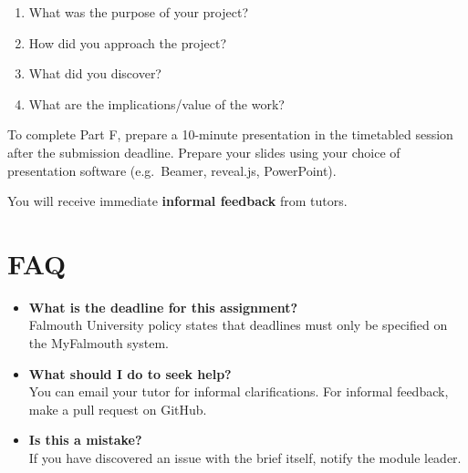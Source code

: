 \begin{enumerate}[label=(\roman*)]
	\item What was the purpose of your project?
	\item How did you approach the project?
	\item What did you discover?
	\item What are the implications/value of the work?
\end{enumerate}

To complete Part F, prepare a 10-minute presentation in the timetabled session after the submission deadline.
Prepare your slides using your choice of presentation software (e.g.\ Beamer, reveal.js, PowerPoint).

You will receive immediate \textbf{informal feedback} from tutors.

\section*{FAQ}

\begin{itemize}
	\item 	\textbf{What is the deadline for this assignment?} \\ 
    		Falmouth University policy states that deadlines must only be specified on the MyFalmouth system.
    		
	\item 	\textbf{What should I do to seek help?} \\ 
    		You can email your tutor for informal clarifications. For informal feedback, make a pull request on GitHub. 
    		
    	\item 	\textbf{Is this a mistake?} \\ 	
    		If you have discovered an issue with the brief itself, notify the module leader.
\end{itemize}
